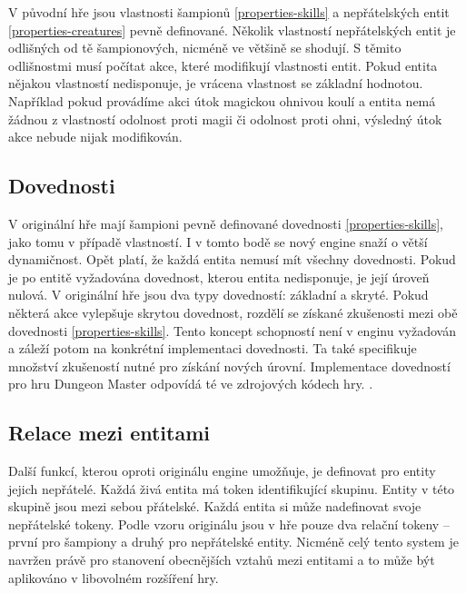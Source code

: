 V původní hře jsou vlastnosti šampionů \vref{properties-skills} a nepřátelských entit \vref{properties-creatures} pevně definované. 
Několik vlastností nepřátelských entit je odlišných od tě šampionových, nicméně ve většině se shodují.
S těmito odlišnostmi musí počítat akce, které modifikují vlastnosti entit. Pokud entita nějakou vlastností nedisponuje, je vrácena 
vlastnost se základní hodnotou. Například pokud provádíme akci útok magickou ohnivou koulí a entita nemá žádnou z vlastností
odolnost proti magii či odolnost proti ohni, výsledný útok akce nebude nijak modifikován. 

 \subsection{Dovednosti}

V originální hře mají šampioni pevně definované dovednosti \vref{properties-skills}, jako tomu v případě vlastností.
I v tomto bodě se nový engine snaží o větší dynamičnost. Opět platí, že každá entita nemusí mít všechny dovednosti.
Pokud je po entitě vyžadována dovednost, kterou entita nedisponuje, je její úroveň nulová.
V originální hře jsou dva typy dovedností: základní a skryté. Pokud některá akce vylepšuje skrytou dovednost,
rozdělí se získané zkušenosti mezi obě dovednosti \vref{properties-skills}. Tento koncept schopností není v enginu vyžadován a 
záleží potom na konkrétní implementaci dovednosti. Ta také specifikuje množství zkušeností nutné pro 
získání nových úrovní. Implementace dovedností pro hru Dungeon Master odpovídá té ve zdrojových kódech hry. \cite{DMDecompilation}.

\subsection{Relace mezi entitami}
Další funkcí, kterou oproti originálu engine umožňuje, je definovat pro entity jejich nepřátelé. Každá živá entita má token identifikující
skupinu. Entity v této skupině jsou mezi sebou přátelské. Každá entita si může nadefinovat svoje nepřátelské tokeny.
Podle vzoru originálu jsou v hře pouze dva relační tokeny -- první pro šampiony a druhý pro nepřátelské entity. Nicméně
celý tento system je navržen právě pro stanovení obecnějších vztahů mezi entitami a to může být aplikováno v libovolném rozšíření hry.
 
